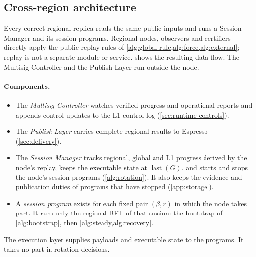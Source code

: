 \documentclass[11pt,a4paper]{article}
\newcommand{\defterm}[1]{\textcolor{rrBlue}{\textit{#1}}}
\begin{document}
\subsection{Cross-region architecture}
\label{sec:runtime-modules}
Every correct regional replica reads the same public inputs and runs a
Session Manager and its session programs.  Regional nodes, observers
and certifiers directly apply the public replay rules of
\cref{alg:global-rule,alg:force,alg:external}; replay is not a separate
module or service.   shows the resulting data
flow. The Multisig Controller and the Publish Layer run outside the
node.

\paragraph{Components.}
\begin{itemize}
\item The \defterm{Multisig Controller} watches verified progress and
operational reports and appends control updates to the L1 control log
(\cref{sec:runtime-controls}).
\item The \defterm{Publish Layer} carries complete regional results to
Espresso (\cref{sec:delivery}).
\item The \defterm{Session Manager} tracks regional, global and L1
progress derived by the node's replay, keeps the executable state at
$\operatorname{last}(G)$, and starts and stops the node's session
programs (\cref{alg:rotation}). It also keeps the evidence and
publication duties of programs that have stopped (\cref{app:storage}).
\item A \defterm{session program} exists for each fixed pair
$(\beta,r)$ in which the node takes part. It runs only the regional BFT
of that session: the bootstrap of \cref{alg:bootstrap}, then
\cref{alg:steady,alg:recovery}.
\end{itemize}
The execution layer supplies payloads and executable state to the
programs. It takes no part in rotation decisions.
\end{document}
